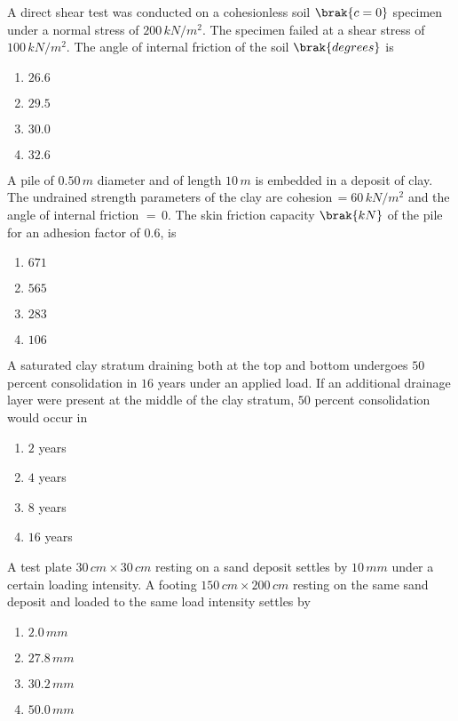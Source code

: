     \item A direct shear test was conducted on a cohesionless soil $\brak{c=0}$ specimen under a normal stress of $200\,kN/m^2$. The specimen failed at a shear stress of $100\,kN/m^2$. The angle of internal friction of the soil $\brak{degrees}$ is
    \begin{enumerate}
        \item $26.6$
        \item $29.5$
        \item $30.0$
        \item $32.6$
    \end{enumerate}
    \item A pile of $0.50\,m$ diameter and of length $10\,m$ is embedded in a deposit of clay. The undrained strength parameters of the clay are cohesion$\,= 60\,kN/m^2$ and the angle of internal friction $=\,0$. The skin friction capacity $\brak{kN}$ of the pile for an adhesion factor of $0.6$, is
    \begin{enumerate}
        \item $671$
        \item $565$
        \item $283$
        \item $106$
    \end{enumerate}
    \item A saturated clay stratum draining both at the top and bottom undergoes $50$ percent consolidation in $16$ years under an applied load. If an additional drainage layer were present at the middle of the clay stratum, $50$ percent consolidation would occur in 
    \begin{enumerate}
        \item $2$ years
        \item $4$ years
        \item $8$ years
        \item $16$ years
    \end{enumerate}
    \item A test plate $30\,cm\times 30\,cm$ resting on a sand deposit settles by $10\,mm$ under a certain loading intensity. A footing $150\,cm\times 200\,cm$ resting on the same sand deposit and loaded to the same load intensity settles by
    \begin{enumerate}
        \item $2.0\,mm$
        \item $27.8\,mm$
        \item $30.2\,mm$
        \item $50.0\,mm$
    \end{enumerate}

